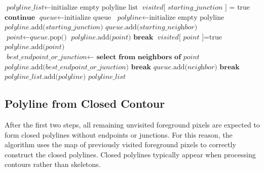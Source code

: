 {
\begin{algorithmic}[1]
	\State $\textit{polyline\_list} \gets \text{initialize empty polyline list}$
	\State
	\State $\textit{visited}\text{[ }\textit{starting\_junction}\text{ ]}$ = true
	\State
			\State $\textbf{continue}$
		\EndIf
		\State
		\State $\textit{queue} \gets \text{initialize queue}$
		\State $\textit{polyline} \gets \text{initialize empty polyline}$
		\State $\textit{polyline}\text{.add(}\textit{starting\_junction}\text{)}$
		\State
		\State $\textit{queue}\text{.add(}\textit{starting\_neighbor}\text{)}$
			\State $\textit{point} \gets \textit{queue}\text{.pop()}$ 
			\State
				\State $\textit{polyline}\text{.add(}\textit{point}\text{)}$
				\State $\textbf{break}$
			\EndIf
			\State
			\State $\textit{visited}\text{[}\textit{ point }\text{]} = \text{true}$
			\State $\textit{polyline}\text{.add(}\textit{point}\text{)}$
			\State
			\State $\textit{best\_endpoint\_or\_junction}\gets\textbf{ select from neighbors of }\textit{point}$
			\State $\textit{polyline}\text{.add(}\textit{best\_endpoint\_or\_junction}\text{)}$
			\State $\textbf{break}$
			\EndIf
			\State
					\State $\textit{queue}\text{.add(}\textit{neighbor}\text{)}$
					\State $\textbf{break}$
				\EndIf
			\EndFor
		\EndWhile
		\State
		\State $\textit{polyline\_list}\text{.add(}\textit{polyline}\text{)}$
	\EndFor
	\State
	\State
	\Return $\textit{polyline\_list}$
	\EndProcedure
\end{algorithmic}
}


\subsection{Polyline from Closed Contour}

After the first two steps, all remaining unvisited foreground pixels are expected to form closed polylines without endpoints or junctions. For this reason, the algorithm uses the map of previously visited foreground pixels to correctly construct the closed polylines. Closed polylines typically appear when processing contours rather than skeletons.

